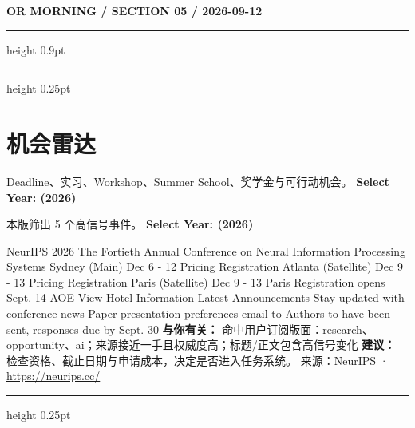 \documentclass[10.5pt]{ctexart}
\begin{document}
\newpage
{\small\bfseries OR MORNING / SECTION 05 / 2026-09-12}
\vspace{2mm}
\hrule height 0.9pt
\vspace{1.5mm}
\hrule height 0.25pt
\vspace{4mm}
\section*{机会雷达}
{\color{ormuted} Deadline、实习、Workshop、Summer School、奖学金与可行动机会。}
\vspace{2mm}
{\LARGE\bfseries Select Year: (2026)}\par
\vspace{1mm}
{\color{ormuted} 本版筛出 5 个高信号事件。}
\vspace{3mm}
{\Large\bfseries Select Year: (2026)}\par
NeurIPS 2026 The Fortieth Annual Conference on Neural Information Processing Systems Sydney (Main) Dec 6 - 12 Pricing Registration Atlanta (Satellite) Dec 9 - 13 Pricing Registration Paris (Satellite) Dec 9 - 13 Paris Registration opens Sept. 14 AOE View Hotel Information Latest Announcements Stay updated with conference news Paper presentation preferences email to Authors to have been sent, responses due by Sept. 30
\textbf{与你有关：} 命中用户订阅版面：research、opportunity、ai；来源接近一手且权威度高；标题/正文包含高信号变化
\textbf{建议：} 检查资格、截止日期与申请成本，决定是否进入任务系统。
{\footnotesize\color{ormuted} 来源：NeurIPS · \url{https://neurips.cc/}}
\vspace{4mm}
\hrule height 0.25pt
\vspace{3mm}
\end{document}

